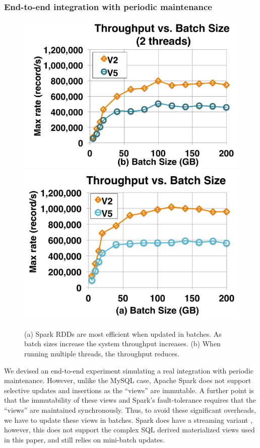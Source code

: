 \iffalse
\subsubsection{End-to-end integration with periodic maintenance}
\begin{figure}[t]
\centering
 \includegraphics[scale=0.14]{exp/con_1.pdf}
 \includegraphics[scale=0.14]{exp/con_2.pdf}\vspace{-1.em}
 \caption{(a) Spark RDDs are most efficient when updated in batches. As batch sizes increase the system throughput increases. (b) When running multiple threads, the throughput reduces. \label{conv-2}}\vspace{-1.25em}
\end{figure}

We devised an end-to-end experiment simulating a real integration with periodic maintenance.
However, unlike the MySQL case, Apache Spark does not support selective updates and insertions as the ``views'' are immutable.
A further point is that the immutability of these views and Spark's fault-tolerance requires that the ``views'' are maintained synchronously.
Thus, to avoid these significant overheads, we have to update these views in batches.
Spark does have a streaming variant \cite{zaharia2012discretized}, however, this does not support the complex SQL derived materialized views used in this paper, and still relies on mini-batch updates.


